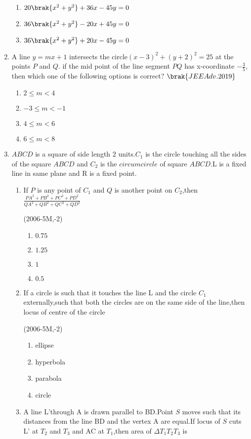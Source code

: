 \begin{enumerate}
\begin{multicols}{2}
\begin{enumerate}
                 \item $20\brak{x^2+y^2}+36x-45y=0$
                 \item $36\brak{x^2+y^2}-20x+45y=0$
                 \item $36\brak{x^2+y^2}+20x-45y=0$
             \end{enumerate}
             \end{multicols}
             \item A line $y=mx+1$ intersects the circle$(x-3)^2+(y+2)^2=25$ at the points $P$ and $Q$. if the mid point of the line segment $PQ$ has x-coordinate $-\frac{3}{5}$, then which one of the following options is correct?
                 \hfill$\brak{JEE Adv. 2019}$
                 \begin{multicols}{2}
             \begin{enumerate}
                 \item $2\le m<4$
                 \item $-3\le m<-1$
                 \item $4\le m<6$
                 \item $6\le m<8$
             \end{enumerate}
             \end{multicols}
\item $ABCD$ is a square of side length $2$ units.$C_1$ is the circle touching all the sides of the square $ABCD$ and $C_2$ is the $circumcircle$ of square $ABCD$.L is a fixed line in same plane and R is a fixed point.\\
\begin{enumerate}
\item If $P$ is any point of $C_1$ and $Q$ is another point on $C_2$,then $\frac{PA^2+PB^2+PC^2+PD^2}{QA^2+QB^2+QC^2+QD^2}$

\hfill(2006-5M,-2)
\begin{enumerate}
\item $0.75$
\item $1.25$
\item $1$
\item $0.5$
\end{enumerate}
\item If a circle is such that it touches the line L and the circle $C_1$ externally,such that both the circles are on the same side of the line,then locus of centre of the circle 

\hfill(2006-5M,-2)
\begin{enumerate}
\item ellipse
\item hyperbola
\item parabola
\item circle
\end{enumerate}
\item A line L'through A is drawn parallel to BD.Point $S$ moves such that its distances from the line BD and the vertex A are equal.If locus of $S$ cuts L' at $T_2$ and $T_3$ and AC at $T_1$,then area of $\Delta T_1T_2T_3$ is


\end{enumerate}
\end{enumerate}
